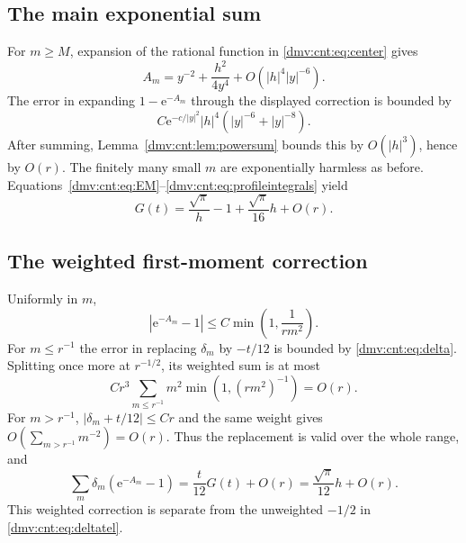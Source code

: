 \documentclass[11pt,letterpaper]{article}
\numberwithin{equation}{section}
\theoremstyle{definition}\newtheorem{definition}[theorem]{Definition}
\theoremstyle{remark}\newtheorem{remark}[theorem]{Remark}
\newcommand{\ee}{\mathrm e}
\begin{document}
\subsection{The main exponential sum}
For $m\ge M$, expansion of the rational function in \eqref{dmv:cnt:eq:center} gives
\[
A_m=y^{-2}+\frac{h^2}{4y^4}+O(|h|^4|y|^{-6}).
\]
The error in expanding $1-\ee^{-A_m}$ through the displayed correction is bounded by
\[
C\ee^{-c/|y|^2}|h|^4(|y|^{-6}+|y|^{-8}).
\]
After summing, Lemma~\ref{dmv:cnt:lem:powersum} bounds this by $O(|h|^3)$, hence by $O(r)$. The finitely many small $m$ are exponentially harmless as before. Equations~\eqref{dmv:cnt:eq:EM}--\eqref{dmv:cnt:eq:profileintegrals} yield
\begin{equation}\label{dmv:cnt:eq:G}
G(t)=\frac{\sqrt\pi}{h}-1+\frac{\sqrt\pi}{16}h+O(r).
\end{equation}

\subsection{The weighted first-moment correction}
Uniformly in $m$,
\begin{equation}\label{dmv:cnt:eq:weightdelta}
|\ee^{-A_m}-1|\le C\min\left(1,\frac1{rm^2}\right).
\end{equation}
For $m\le r^{-1}$ the error in replacing $\delta_m$ by $-t/12$ is bounded by \eqref{dmv:cnt:eq:delta}. Splitting once more at $r^{-1/2}$, its weighted sum is at most
\begin{equation}\label{dmv:cnt:eq:deltabelow}
Cr^3\sum_{m\le r^{-1}}m^2\min(1,(rm^2)^{-1})=O(r).
\end{equation}
For $m>r^{-1}$, $|\delta_m+t/12|\le Cr$ and the same weight gives $O(\sum_{m>r^{-1}}m^{-2})=O(r)$. Thus the replacement is valid over the whole range, and
\begin{equation}\label{dmv:cnt:eq:weighted-delta}
\sum_m\delta_m(\ee^{-A_m}-1)=\frac t{12}G(t)+O(r)
=\frac{\sqrt\pi}{12}h+O(r).
\end{equation}
This weighted correction is separate from the unweighted $-1/2$ in \eqref{dmv:cnt:eq:deltatel}.
\end{document}
